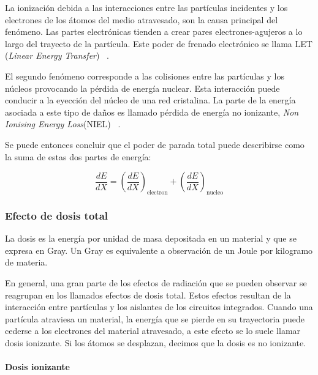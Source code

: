 \documentclass[a4paper,openright,12pt]{report}
\begin{document}
La ionización debida a las interacciones entre las partículas incidentes y los electrones de los átomos del medio atravesado, son la causa principal del fenómeno. Las partes electrónicas tienden a  crear pares electrones-agujeros a lo largo del trayecto de la partícula. Este poder de frenado electrónico se llama LET (\textit{Linear Energy Transfer}) ~\cite{4395093}.
	
El segundo fenómeno corresponde a las colisiones entre las partículas y los núcleos provocando la pérdida de energía nuclear. Esta interacción puede conducir a la eyección del núcleo de una red cristalina. La parte de la energía asociada a este tipo de daños es llamado pérdida de energía no ionizante,  \textit{Non Ionising Energy Loss}(NIEL) ~\cite{316523}.

Se puede entonces concluir que el poder de parada total puede describirse como la suma de estas dos partes de energía:

\begin{equation}\label{EQ1}
\frac{dE}{dX}=\left(\frac{dE}{dX}\right)_\text{electron}+\left(\frac{dE}{dX}\right)_\text{nucleo}
\end{equation}

\subsubsection{Efecto de dosis total}

La dosis es la energía por unidad de masa depositada en un material y que se expresa en Gray. Un Gray es equivalente a observación de un Joule por kilogramo de materia.

En general, una gran parte de los efectos de radiación que se pueden observar se  reagrupan en los llamados efectos de dosis total. Estos efectos resultan de la interacción entre partículas y los aislantes de los circuitos integrados. Cuando una partícula atraviesa un material, la energía que se pierde en su trayectoria puede cederse a los electrones del material atravesado, a este efecto se lo suele llamar dosis ionizante. Si los átomos se  desplazan, decimos que la dosis es no ionizante.


\paragraph{Dosis ionizante}\hfill \break
 
\end{document}
